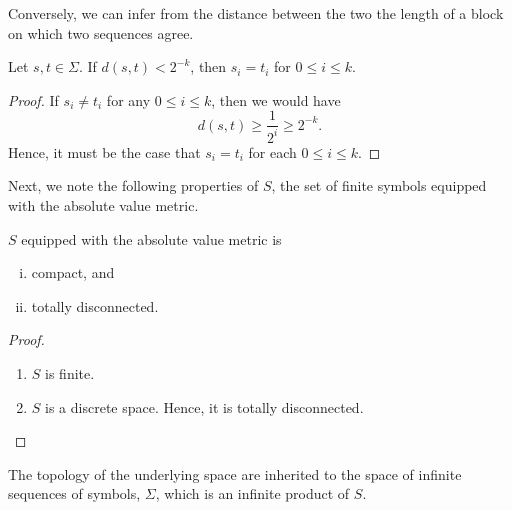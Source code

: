 \documentclass[10pt,twoside]{book}
\begin{document}
Conversely, we can infer from the distance between the two the length of a block on which two sequences agree.
\begin{proposition}
  Let $s, t \in \Sigma$.
  If $d(s,t) < 2^{-k}$, then $s_i = t_i$ for $0 \leq i \leq k$.
  \label{prop:symbol-bound2}
  \begin{proof}
    If $s_i \neq t_i$ for any $0 \leq i \leq k$, then we would have
    \begin{equation*}
      d(s,t) \geq \frac{1}{2^i} \geq 2^{-k}.
    \end{equation*}
    Hence, it must be the case that $s_i = t_i$ for each $0 \leq i \leq k$.
  \end{proof}
\end{proposition}
Next, we note the following properties of $S$, the set of finite symbols equipped with the absolute value metric.
\begin{proposition}
  $S$ equipped with the absolute value metric is 
  \begin{enumerate}[(i)]
    \item compact, and
    \item totally disconnected.
  \end{enumerate}
  \begin{proof}
    \begin{enumerate}
      \item
        $S$ is finite.
      \item 
        $S$ is a discrete space.
        Hence, it is totally disconnected.
    \end{enumerate}
  \end{proof}
\end{proposition}
The topology of the underlying space are inherited to the space of infinite sequences of symbols, $\Sigma$, which is an infinite product of $S$.
\end{document}
